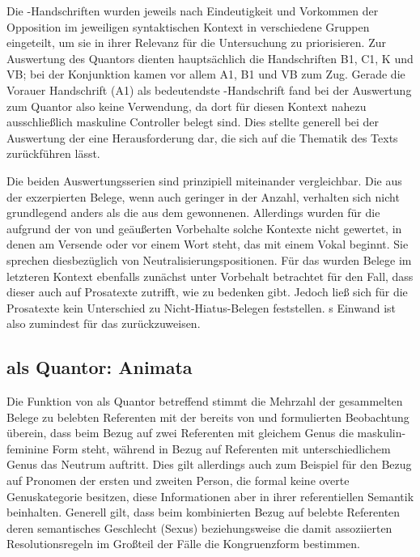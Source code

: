 Die \KC{}-Handschriften wurden jeweils nach Eindeutigkeit und Vorkommen
der Opposition im jeweiligen syntaktischen Kontext in verschiedene Gruppen
eingeteilt, um sie in ihrer Relevanz für die Untersuchung zu priorisieren. Zur
Auswertung des Quantors  dienten hauptsächlich die Handschriften
B1, C1, K und VB; bei der
Konjunktion  kamen vor allem A1, B1 und
VB zum Zug. Gerade die Vorauer Handschrift (A1) als
bedeutendste \KC{}-Handschrift fand bei der Auswertung zum Quantor
 also keine Verwendung, da dort für diesen Kontext nahezu
ausschließlich maskuline Controller belegt sind. Dies stellte generell bei der
Auswertung der \KC{} eine Herausforderung dar, die sich auf die Thematik
des Texts zurückführen lässt.

Die beiden Auswertungsserien sind prinzipiell miteinander vergleichbar. Die aus
der \KC{} exzerpierten Belege, wenn auch geringer in der Anzahl, verhalten sich
nicht grundlegend anders als die aus dem \CAO{} gewonnenen. Allerdings wurden
für die \KC{} aufgrund der von \citet[89--90]{askedal1973} und
\citet[191]{gjelsten1980} geäußerten Vorbehalte solche Kontexte nicht gewertet,
in denen  am Versende oder vor einem Wort steht, das mit einem
Vokal beginnt. Sie sprechen diesbezüglich von Neutralisierungs\-positionen. Für
das \CAO{} wurden Belege im letzteren Kontext ebenfalls zunächst unter
Vorbehalt betrachtet für den Fall, dass dieser auch auf Prosatexte zutrifft,
wie \citet[92]{askedal1973} zu bedenken gibt. Jedoch ließ sich für die
Prosatexte kein Unterschied zu Nicht-\allowbreak{}Hiatus-\allowbreak{}Belegen
feststellen. \citeauthor{askedal1973}s Einwand ist also zumindest für das
\CAO{} zurückzuweisen.

\subsection{ als Quantor: Animata}

Die Funktion von  als Quantor betreffend stimmt die Mehrzahl der
gesammelten Belege zu belebten Referenten mit der bereits von
\citet[312]{grimm1890} und \citet[39--41]{behaghel1928} formulierten
Beobachtung überein, dass beim Bezug auf zwei Referenten mit gleichem Genus die
maskulin-feminine Form steht, während in Bezug auf Referenten mit
unterschiedlichem Genus das Neutrum auftritt. Dies gilt allerdings auch zum
Beispiel für den Bezug auf Pronomen der ersten und zweiten Person, die formal
keine overte Genuskategorie besitzen, diese Informationen aber in ihrer
referentiellen Semantik beinhalten. Generell gilt, dass beim kombinierten Bezug
auf belebte Referenten deren semantisches Geschlecht (Sexus) beziehungsweise
die damit assoziierten Resolutionsregeln im Großteil der Fälle die
Kongruenzform bestimmen.

